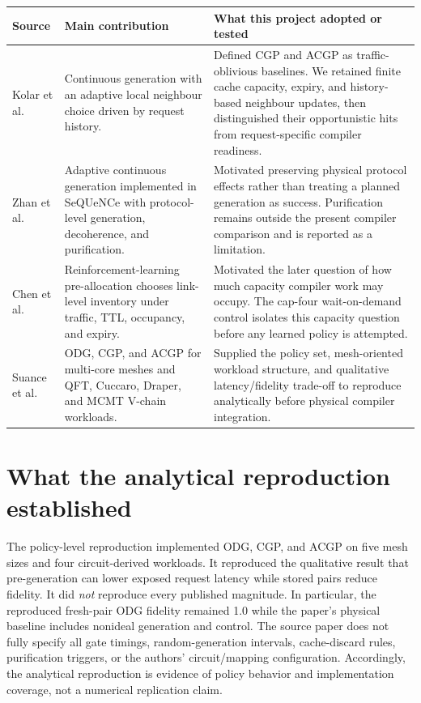 \documentclass[11pt,a4paper]{report}
\begin{document}
\begin{longtable}{p{}p{}p{}}
\toprule
Source & Main contribution & What this project adopted or tested \\
\midrule
Kolar et al. \cite{Kolar2022} & Continuous generation with an adaptive local
neighbour choice driven by request history. & Defined CGP and ACGP as
traffic-oblivious baselines. We retained finite cache capacity, expiry, and
history-based neighbour updates, then distinguished their opportunistic hits
from request-specific compiler readiness. \\
Zhan et al. \cite{Zhan2025} & Adaptive continuous generation implemented in
SeQUeNCe with protocol-level generation, decoherence, and purification. &
Motivated preserving physical protocol effects rather than treating a planned
generation as success. Purification remains outside the present compiler
comparison and is reported as a limitation. \\
Chen et al. \cite{AEPA} & Reinforcement-learning pre-allocation chooses
link-level inventory under traffic, TTL, occupancy, and expiry. & Motivated the
later question of how much capacity compiler work may occupy. The cap-four
wait-on-demand control isolates this capacity question before any learned
policy is attempted. \\
Suance et al. \cite{Suance2026} & ODG, CGP, and ACGP for multi-core meshes and
QFT, Cuccaro, Draper, and MCMT V-chain workloads. & Supplied the policy set,
mesh-oriented workload structure, and qualitative latency/fidelity trade-off
to reproduce analytically before physical compiler integration. \\
\bottomrule
\end{longtable}

\section{What the analytical reproduction established}
The policy-level reproduction implemented ODG, CGP, and ACGP on five mesh
sizes and four circuit-derived workloads. It reproduced the qualitative result
that pre-generation can lower exposed request latency while stored pairs reduce
fidelity. It did \emph{not} reproduce every published magnitude. In particular,
the reproduced fresh-pair ODG fidelity remained 1.0 while the paper's physical
baseline includes nonideal generation and control. The source paper does not
fully specify all gate timings, random-generation intervals, cache-discard
rules, purification triggers, or the authors' circuit/mapping configuration.
Accordingly, the analytical reproduction is evidence of policy behavior and
implementation coverage, not a numerical replication claim.
\end{document}
